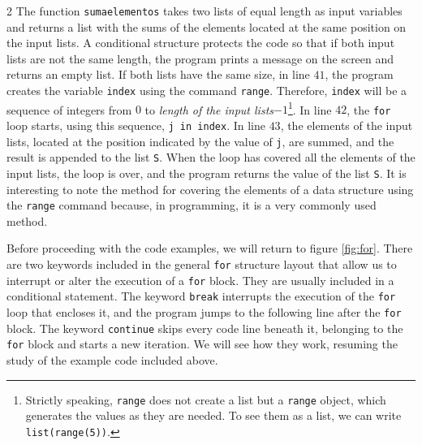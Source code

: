 \begin{paracol}{2}
The function \texttt{sumaelementos} takes two lists of equal length as input variables and returns a list with the sums of the elements located at the same position on the input lists. A conditional structure protects the code so that if both input lists are not the same length, the program prints a message on the screen and returns an empty list. If both lists have the same size, in line $41$, the program creates the variable \texttt{index} using the command \texttt{range}. Therefore, \texttt{index} will be a sequence of integers from $0$ to \emph{length of the input lists}$- 1$\footnote{Strictly speaking, \texttt{range} does not create a list but a \texttt{range} object, which generates the values as they are needed. To see them as a list, we can write \texttt{list(range(5))}.}. In line $42$, the \texttt{for} loop starts, using this sequence, \texttt{j in index}. In line $43$, the elements of the input lists, located at the position indicated by the value of \texttt{j}, are summed, and the result is appended to the list \texttt{S}. When the loop has covered all the elements of the input lists, the loop is over, and the program returns the value of the list \texttt{S}. It is interesting to note the method for covering the elements of a data structure using the \texttt{range} command because, in programming, it is a very commonly used method.

Before proceeding with the code examples, we will return to figure \ref{fig:for}. There are two keywords included in the general \texttt{for} structure layout that allow us to interrupt or alter the execution of a \texttt{for} block. They are usually included in a conditional statement. The keyword \texttt{break} interrupts the execution of the \texttt{for} loop that encloses it, and the program jumps to the following line after the \texttt{for} block. The keyword \texttt{continue} skips every code line beneath it, belonging to the \texttt{for} block and starts a new iteration. We will see how they work, resuming the study of the example code included above. 


\end{paracol}
